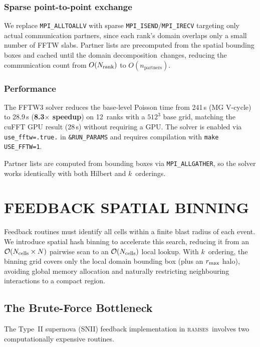 \documentclass[fleqn,usenatbib]{mnras}
\newcommand{\ramses}{\textsc{ramses}}
\newcommand{\nrank}{N_{\rm rank}}
\newcommand{\ksec}{\ensuremath{k}\text{-section}}
\newcommand{\Olog}[1]{\mathcal{O}(#1)}
\newcommand{\code}[1]{\texttt{#1}}
\newcommand{\dd}[0]{{domain decomposition}}
\begin{document}
\subsubsection{Sparse point-to-point exchange}
We replace \code{MPI\_ALLTOALLV} with sparse
\code{MPI\_ISEND}/\code{MPI\_IRECV} targeting only actual
communication partners, since each rank's domain overlaps only a
small number of FFTW slabs.  Partner lists are precomputed from the
spatial bounding boxes and cached until the \dd\
changes, reducing the communication count from $O(\nrank)$ to
$O(n_{\text{partners}})$.

\subsubsection{Performance}
The FFTW3 solver reduces the base-level Poisson time from 241\,s
(MG V-cycle) to 28.9\,s (\textbf{8.3$\times$ speedup}) on 12~ranks
with a $512^3$ base grid, matching the cuFFT GPU result (28\,s)
without requiring a GPU.
The solver is enabled via \code{use\_fftw=.true.} in
\code{\&RUN\_PARAMS} and requires compilation with
\code{make USE\_FFTW=1}.

Partner lists are computed from bounding boxes via
\code{MPI\_ALLGATHER}, so the solver works identically with both
Hilbert and \ksec\ orderings.


\section{FEEDBACK SPATIAL BINNING}
\label{sec:feedback}
Feedback routines must identify all cells within a finite blast
radius of each event.  We introduce spatial hash binning to
accelerate this search, reducing it from an
$\Olog{N_{\rm cells} \times N}$ pairwise scan to an
$\Olog{N_{\rm cells}}$ local lookup.  With \ksec\ ordering, the
binning grid covers only the local domain bounding box (plus an
$r_{\rm max}$ halo), avoiding global memory allocation and
naturally restricting neighbouring interactions to a compact
region.
\subsection{The Brute-Force Bottleneck}
\label{sec:fb_problem}

The Type~II supernova (SNII) feedback implementation in \ramses\
involves two computationally expensive routines.
\end{document}
